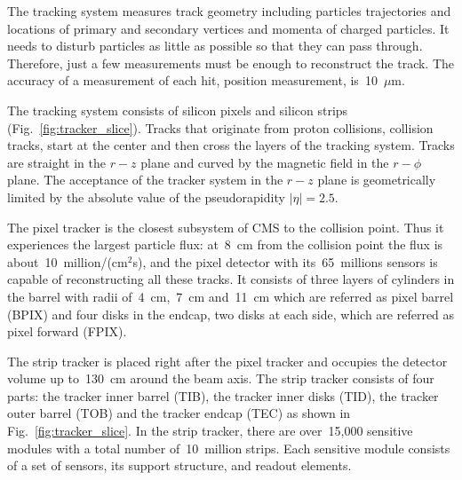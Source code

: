 The tracking system measures track geometry including particles trajectories and locations of primary and secondary vertices and momenta of charged particles. It needs to disturb particles as little as possible so that they can pass through. Therefore, just a few measurements must be enough to reconstruct the track. The accuracy of a measurement of each hit, position measurement, is~10~$\mu$m.

The tracking system consists of silicon pixels and silicon strips (Fig.~\ref{fig:tracker_slice}). Tracks that originate from proton collisions, collision tracks, start at the center and then cross the layers of the tracking system. Tracks are straight in the $r-z$ plane and curved by the magnetic field in the $r-\phi$ plane. The acceptance of the tracker system in the $r-z$ plane is geometrically limited by the absolute value of the pseudorapidity $|\eta|=2.5$.

The pixel tracker is the closest subsystem of CMS to the collision point. Thus it experiences the largest particle flux: at~8~cm from the collision point the flux is about~10~million/(cm$^2$s), and the pixel detector with its~65~millions sensors is capable of reconstructing all these tracks. It consists of three layers of cylinders in the barrel with radii of~4~cm,~7~cm and~11~cm which are referred as pixel barrel (BPIX) and four disks in the endcap, two disks at each side, which are referred as pixel forward (FPIX). 


The strip tracker is placed right after the pixel tracker and occupies the detector volume up to~130~cm around the beam axis. The strip tracker consists of four parts: the tracker inner barrel (TIB), the tracker inner disks (TID), the tracker outer barrel (TOB) and the tracker endcap (TEC) as shown in Fig.~\ref{fig:tracker_slice}. In the strip tracker, there are over~15,000 sensitive modules with a total number of~10~million strips. Each sensitive module consists of a set of sensors, its support structure, and readout elements.



